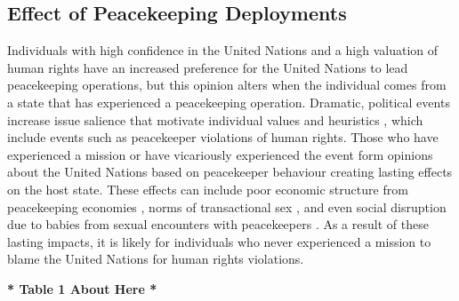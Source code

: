 \documentclass[12pt]{article}
\newcommand{\UN}[1]{United Nations}
\newcommand{\PKO}[1]{peacekeeping operation}
\newcommand{\PKOs}[1]{peacekeeping operations}
\begin{document}
\subsection*{Effect of Peacekeeping Deployments}

Individuals with high confidence in the \UN{} and a high valuation of human rights have an increased preference for the \UN{} to lead \PKOs{}, but this opinion alters when the individual comes from a state that has experienced a \PKO{}. Dramatic, political events increase issue salience that motivate individual values and heuristics \citep{conover1984influence,conover1988role,hetherington2011authoritarianism}, which include events such as peacekeeper violations of human rights. Those who have experienced a mission or have vicariously experienced the event \citep{mondak2017vicarious} form opinions about the \UN{} based on peacekeeper behaviour creating lasting effects on the host state. These effects can include poor economic structure from peacekeeping economies \citep{beber2019promise}, norms of transactional sex \citep{beber2017peacekeeping}, and even social disruption due to babies from sexual encounters with peacekeepers \citep{simic2014peacekeeper}. As a result of these lasting impacts, it is likely for individuals who never experienced a mission to blame the \UN{} for human rights violations. 

\begin{center}
{\large \textbf{* Table 1 About Here *}}
\end{center}
\end{document}
